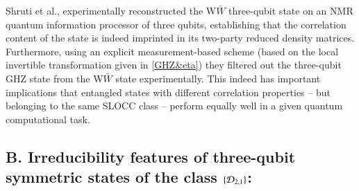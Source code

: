 Shruti et al., \cite{arvind} experimentally reconstructed the W$\bar W$ three-qubit state on an NMR quantum information processor of three qubits,  establishing that the correlation content of the state is indeed imprinted in  its two-party reduced density matrices. Furthermore, using an explicit measurement-based scheme (based on the local invertible transformation given in \eqref{GHZ&eta})  they filtered out the  three-qubit GHZ state from the W$\bar W$ state experimentally. This indeed has important implications that  entangled states with different correlation properties -- but  belonging to the same SLOCC class -- perform equally well in a given quantum computational task.

\subsection*{B. Irreducibility features of three-qubit symmetric states of the class $\{{\cal D}_{2,1} \}$:}

